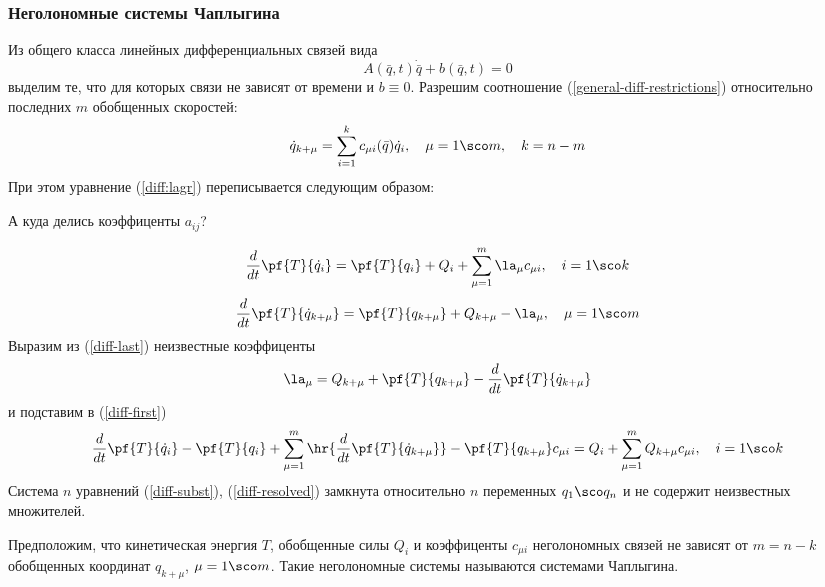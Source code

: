 \documentclass[a4paper,12pt]{article}
\begin{document}
\subsubsection{Неголономные системы Чаплыгина}
Из общего класса линейных дифференциальных связей вида
\begin{equation}
  \label{general-diff-restrictions}
  A(\bar q, t)\dot{\bar q} + b(\bar q, t) = 0
\end{equation}
выделим те, что для которых связи не зависят от времени и $ b \equiv 0$.
Разрешим соотношение (\ref{general-diff-restrictions}) относительно последних $m$ обобщенных скоростей:
\begin{equation}
  \label{diff-resolved}
  \dot q_{k+\mu} = \sum_{i=1}^k c_{\mu i}(\bar q)\dot q_i, \quad \mu=1\sco m,\quad k = n-m
\end{equation}
При этом уравнение (\ref{diff:lagr}) переписывается следующим образом:
\begin{petit}
  А куда делись коэффиценты $a_{ij}$?
\end{petit}
\begin{equation}
  \label{diff-first}
  \frac{d}{dt}\pf{T}{\dot q_i} = \pf{T}{q_i} + Q_i + \sum_{\mu=1}^m \la_\mu c_{\mu i}, \quad i = 1\sco k
\end{equation}
\begin{equation}
  \label{diff-last}
  \frac{d}{dt}\pf{T}{\dot q_{k+\mu}} = \pf{T}{q_{k+\mu}} + Q_{k+\mu} -\la_\mu,\quad \mu = 1\sco m
\end{equation}
Выразим из (\ref{diff-last}) неизвестные коэффиценты
\begin{equation}
  \la_\mu = Q_{k+\mu}+\pf{T}{q_{k+\mu}} - \frac{d}{dt}\pf{T}{\dot q_{k+\mu}}
\end{equation}
и подставим в (\ref{diff-first})
\begin{equation}
  \label{diff-subst}
  \frac{d}{dt}\pf{T}{\dot q_i} - \pf{T}{q_i} +
  \sum_{\mu=1}^m\hr{\frac{d}{dt}\pf{T}{\dot q_{k+\mu}}}
    -\pf{T}{q_{k+\mu}}c_{\mu i} = Q_i + \sum_{\mu = 1}^m Q_{k+\mu}c_{\mu i}, \quad  i = 1\sco k
\end{equation}
Система $n$ уравнений (\ref{diff-subst}), (\ref{diff-resolved}) замкнута относительно $n$ переменных
$q_1\sco q_n$ и не содержит неизвестных множителей.

Предположим, что кинетическая энергия $T$, обобщенные силы $Q_i$ и
коэффиценты $c_{\mu i}$ неголономных связей не зависят от $m = n - k$
обобщенных координат $q_{k+\mu}$, $\mu = 1\sco m$. Такие неголономные
системы называются системами Чаплыгина.
\end{document}

